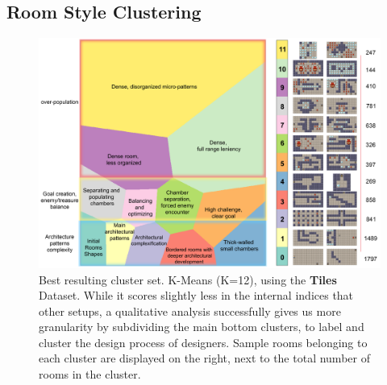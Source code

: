 \subsection{Room Style Clustering}

\begin{figure}[t]
\centerline{\includegraphics[width=\textwidth]{figures/figure2.png}}
\caption{Best resulting cluster set. K-Means (K=12), using the \textbf{Tiles} Dataset. While it scores slightly less in the internal indices that other setups, a qualitative analysis successfully gives us more granularity by subdividing the main bottom clusters, to label and cluster the design process of designers. Sample rooms belonging to each cluster are displayed on the right, next to the total number of rooms in the cluster.} \label{fig:all-clusters}
\end{figure}


